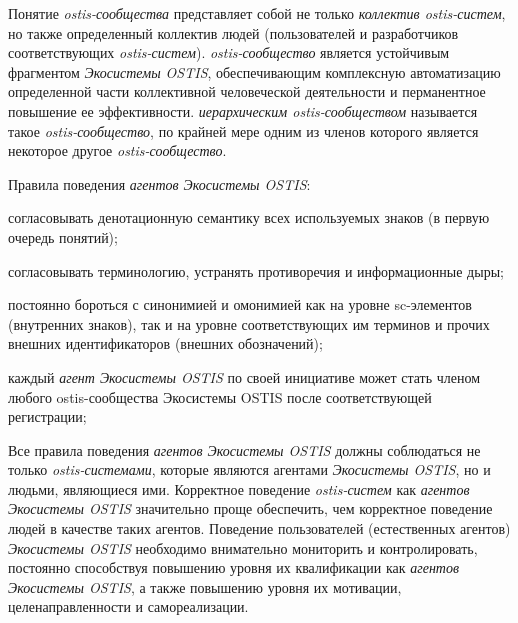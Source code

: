 Понятие \textit{ostis-сообщества} представляет собой не только \textit{коллектив ostis-систем}, но также определенный коллектив людей (пользователей и разработчиков соответствующих \textit{ostis-систем}). 
\textit{ostis-сообщество} является устойчивым фрагментом \textit{Экосистемы OSTIS}, обеспечивающим комплексную автоматизацию определенной части коллективной человеческой деятельности и перманентное повышение ее эффективности. 
\textit{иерархическим ostis-сообществом} называется такое \textit{ostis-сообщество}, по крайней мере одним из членов которого является некоторое другое \textit{ostis-сообщество}.

Правила поведения \textit{агентов Экосистемы OSTIS}:
\begin{textitemize}
    \item согласовывать денотационную семантику всех используемых знаков (в первую очередь понятий);
    \item согласовывать терминологию, устранять противоречия и информационные дыры;
    \item постоянно бороться с синонимией и омонимией как на уровне sc-элементов (внутренних знаков), так и на уровне соответствующих им терминов и прочих внешних идентификаторов (внешних обозначений);
    \item каждый \textit{агент Экосистемы OSTIS} по своей инициативе может стать членом любого ostis-сообщества Экосистемы OSTIS после соответствующей регистрации;
\end{textitemize}

Все правила поведения \textit{агентов Экосистемы OSTIS} должны соблюдаться не только \textit{ostis-системами}, которые являются агентами \textit{Экосистемы OSTIS}, но и людьми, являющиеся ими. 
Корректное поведение \textit{ostis-систем} как \textit{агентов Экосистемы OSTIS} значительно проще обеспечить, чем корректное поведение людей в качестве таких агентов. 
Поведение пользователей (естественных агентов) \textit{Экосистемы OSTIS} необходимо внимательно мониторить и контролировать, постоянно способствуя повышению уровня их квалификации как \textit{агентов Экосистемы OSTIS}, а также повышению уровня их мотивации, целенаправленности и самореализации.

